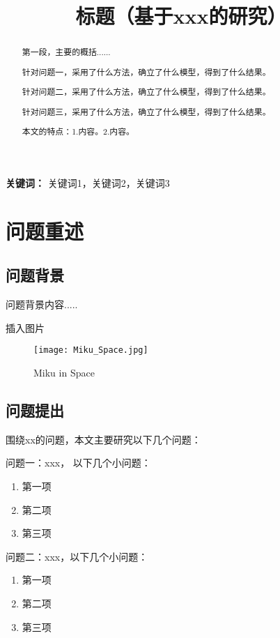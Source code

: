 \documentclass[12pt,a4paper]{article}
\title{\zihao{3}\heiti 标题（基于xxx的研究）}
\author{}
\date{}
\begin{document}
\maketitle
\thispagestyle{empty}
\vspace{-2.5cm}
\begin{abstract}
\vspace{-0.5cm}
\songti
第一段，主要的概括...... 

针对问题一，采用了什么方法，确立了什么模型，得到了什么结果。

针对问题二，采用了什么方法，确立了什么模型，得到了什么结果。

针对问题三，采用了什么方法，确立了什么模型，得到了什么结果。

本文的特点：1.内容。2.内容。
\end{abstract}

\vspace{0cm}
\noindent%
\textbf{关键词：} 关键词1，关键词2，关键词3
\newpage

\tableofcontents
\thispagestyle{empty}
\newpage
\setcounter{page}{1}
\section{问题重述}
\subsection{问题背景}
问题背景内容.....

插入图片
\begin{figure}[ht]%
  \centering
  \texttt{[image: Miku\_Space.jpg]}
  \caption{Miku in Space}
  \label{img:Miku}    
\end{figure}
\subsection{问题提出}
围绕xx的问题，本文主要研究以下几个问题：

问题一：xxx， 以下几个小问题：
\begin{enumerate}[itemsep=-0.2em,topsep=0em]
  \item 第一项
  \item 第二项
  \item 第三项
\end{enumerate}

问题二：xxx，以下几个小问题：
\begin{enumerate}[itemsep=-0.2em,topsep=0em]
  \item 第一项
  \item 第二项
  \item 第三项
\end{enumerate}
\end{document}
